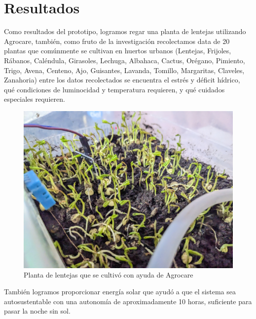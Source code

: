 \section{Resultados}
Como resultados del prototipo, logramos regar una planta de lentejas utilizando Agrocare, también, como fruto de la investigación recolectamos data de 20 plantas que comúnmente se cultivan en huertos urbanos (Lentejas, Frijoles, Rábanos, Caléndula, Girasoles, Lechuga, Albahaca, Cactus, Orégano, Pimiento, Trigo, Avena, Centeno, Ajo, Guisantes, Lavanda, Tomillo, Margaritas, Claveles, Zanahoria) entre los datos recolectados se encuentra el estrés y déficit hídrico, qué condiciones de luminocidad y temperatura requieren, y qué cuidados especiales requieren.

\renewcommand{\figurename}{Figura}
\begin{figure}[h]
  \centering
  \includegraphics[width=\linewidth]{planta.jpg}
  \caption{Planta de lentejas que se cultivó con ayuda de Agrocare}
  \label{fig:example}
\end{figure}

También logramos proporcionar energía solar que ayudó a que el sistema sea autosustentable con una autonomía de aproximadamente 10 horas, suficiente para pasar la noche sin sol.
